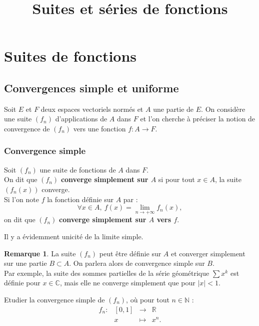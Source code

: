 \documentclass[french]{article}
\title{Suites et séries de fonctions}
\date{}
\newcommand{\N}{\mathbb{N}}
\newcommand{\R}{\mathbb{R}}
\newcommand{\C}{\mathbb{C}}
\theoremstyle{plain}
\theoremstyle{definition}
\newtheorem*{rmq}{Remarque}
\theoremstyle{remark}
\begin{document}
\tableofcontents

\newpage
\maketitle

\section{Suites de fonctions}

\subsection{Convergences simple et uniforme}

Soit $E$ et $F$ deux espaces vectoriels normés et $A$ une partie de $E$. On considère une suite $(f_n)$ d'applications de $A$ dans $F$ et l'on cherche à préciser la notion de convergence de $(f_n)$ vers une fonction $f:A\to F$.

\subsubsection*{Convergence simple}

\begin{dfn}
	Soit $(f_n)$ une suite de fonctions de $A$ dans $F$.\\
	On dit que $(f_n)$ \textbf{converge simplement sur $A$} si pour tout $x\in A$, la suite $(f_n(x))$ converge.\\
	Si l'on note $f$ la fonction définie sur $A$ par :
	$$\forall x\in A,\ f(x)=\underset{n\to+\infty}{\lim}f_n(x),$$ on dit que $(f_n)$ \textbf{converge simplement sur $A$ vers $f$}.
\end{dfn}

Il y a évidemment unicité de la limite simple.

\begin{rmq}
	La suite $(f_n)$ peut être définie sur $A$ et converger simplement sur une partie $B\subset A$. On parlera alors de convergence simple sur $B$.\\
	Par exemple, la suite des sommes partielles de la série géométrique $\displaystyle\sum x^k$ est définie pour $x\in\C$, mais elle ne converge simplement que pour $\lvert x\rvert<1$.
\end{rmq}

\begin{exo}
	Etudier la convergence simple de $(f_n)$, où pour tout $n\in\N$ :
	$$\begin{array}{lrcl}
		f_n:&[0,1]&\longrightarrow&\R\\
		&x&\longmapsto&x^n.
	\end{array}$$
\end{exo}%
\end{document}
